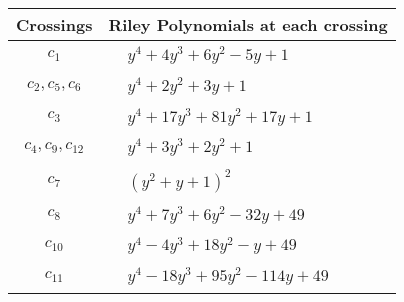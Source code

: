 \documentclass[1p]{elsarticle_modified}
\theoremstyle{definition}
\begin{document}
\begin{tabular}{m{50pt}|m{274pt}}
Crossings & \hspace{64pt}Riley Polynomials at each crossing \\
\hline $$\begin{aligned}c_{1}\end{aligned}$$&$\begin{aligned}
&y^4+4 y^3+6 y^2-5 y+1
\end{aligned}$\\
\hline $$\begin{aligned}c_{2},c_{5},c_{6}\end{aligned}$$&$\begin{aligned}
&y^4+2 y^2+3 y+1
\end{aligned}$\\
\hline $$\begin{aligned}c_{3}\end{aligned}$$&$\begin{aligned}
&y^4+17 y^3+81 y^2+17 y+1
\end{aligned}$\\
\hline $$\begin{aligned}c_{4},c_{9},c_{12}\end{aligned}$$&$\begin{aligned}
&y^4+3 y^3+2 y^2+1
\end{aligned}$\\
\hline $$\begin{aligned}c_{7}\end{aligned}$$&$\begin{aligned}
&(y^2+y+1)^2
\end{aligned}$\\
\hline $$\begin{aligned}c_{8}\end{aligned}$$&$\begin{aligned}
&y^4+7 y^3+6 y^2-32 y+49
\end{aligned}$\\
\hline $$\begin{aligned}c_{10}\end{aligned}$$&$\begin{aligned}
&y^4-4 y^3+18 y^2- y+49
\end{aligned}$\\
\hline $$\begin{aligned}c_{11}\end{aligned}$$&$\begin{aligned}
&y^4-18 y^3+95 y^2-114 y+49
\end{aligned}$\\
\hline
\end{tabular}\\~\\
\end{document}
